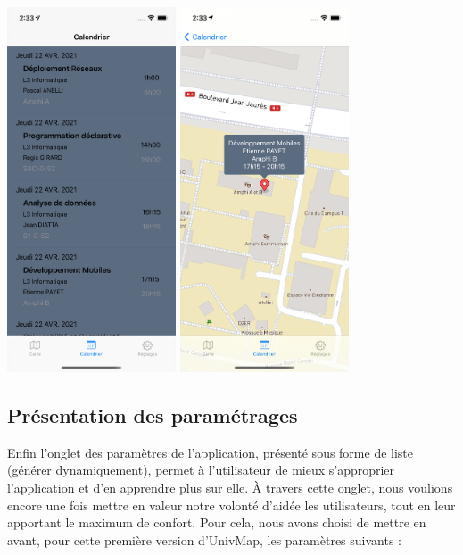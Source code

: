 \documentclass{article}
\begin{document}
\begin{center}
    \includegraphics[width=50mm, scale=0.5]{calendar.png}
    \includegraphics[width=50mm, scale=0.5]{calendar_position.png}
\end{center}



\newpage %



\subsection{Présentation des paramétrages}
Enfin l'onglet des paramètres de l'application, présenté sous forme de liste (générer dynamiquement), permet à l'utilisateur
de mieux s'approprier l'application et d'en apprendre plus sur elle. À travers cette onglet, nous voulions encore une fois
mettre en valeur notre volonté d'aidée les utilisateurs, tout en leur apportant le maximum de confort. Pour cela, nous avons
choisi de mettre en avant, pour cette première version d'UnivMap, les paramètres suivants :\\
\end{document}
